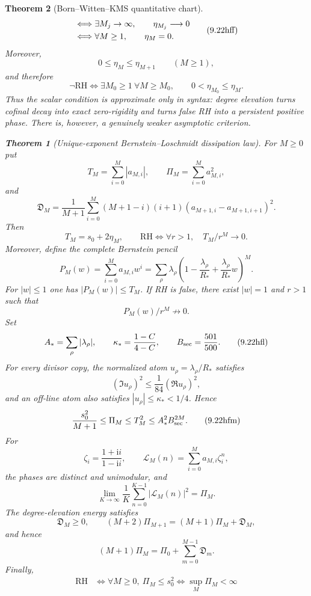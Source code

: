 \documentclass[11pt]{article}
\newtheorem{theorem}{Theorem}[section]
\begin{document}
\begin{theorem}[Born--Witten--KMS quantitative chart]
\[{\begin{aligned}
 &\Longleftrightarrow
 \exists M_j\to\infty,\qquad \eta_{M_j}\longrightarrow0\notag\\
 &\Longleftrightarrow
 \forall M\ge1,\qquad \eta_M=0.
 \end{aligned}}
 \tag{9.22hff}
\]
Moreover,
\[
 0\le\eta_M\le\eta_{M+1}\qquad(M\ge1),
 \tag{9.22hfg}
\]
and therefore
\[
 \neg\mathrm{RH}
 \Longleftrightarrow
 \exists M_0\ge1\ \forall M\ge M_0,\qquad
 0<\eta_{M_0}\le\eta_M.
 \tag{9.22hfh}
\]
Thus the scalar condition is approximate only in syntax: degree elevation turns cofinal decay
into exact zero-rigidity and turns false RH into a persistent positive phase.  There is,
however, a genuinely weaker asymptotic criterion.

\begin{theorem}[Unique-exponent Bernstein--Loschmidt dissipation law]
\label{thm:bernstein-spectral-phase}
For $M\ge0$ put
\[
 T_M=\sum_{i=0}^M|a_{M,i}|,\qquad
 \Pi_M=\sum_{i=0}^M a_{M,i}^2,
\]
and
\[
 \mathfrak D_M=\frac1{M+1}\sum_{i=0}^{M}(M+1-i)(i+1)
 (a_{M+1,i}-a_{M+1,i+1})^2.
\]
Then
\[
 T_M=s_0+2\eta_M,
 \qquad
 \mathrm{RH}\Longleftrightarrow
 \forall r>1,\quad T_M/r^M\longrightarrow0.
 \tag{9.22hfi}
\]
Moreover, define the complete Bernstein pencil
\[
 P_M(w)=\sum_{i=0}^Ma_{M,i}w^i
 =\sum_\rho\lambda_\rho
 \left(1-\frac{\lambda_\rho}{R_*}
       +\frac{\lambda_\rho}{R_*}w\right)^M.
 \tag{9.22hfj}
\]
For $|w|\le1$ one has $|P_M(w)|\le T_M$.  If RH is false, there exist $|w|=1$ and $r>1$ such
that
\[
 P_M(w)/r^M\not\longrightarrow0.
 \tag{9.22hfk}
\]
Set
\[
 A_*=\sum_\rho|\lambda_\rho|,\qquad
 \kappa_*=\frac{1-C}{4-C},\qquad
 B_{\rm sec}=\frac{501}{500}.
 \tag{9.22hfl}
\]
For every divisor copy, the normalized atom $u_\rho=\lambda_\rho/R_*$ satisfies
\[
 (\Im u_\rho)^2\le\frac1{84}(\Re u_\rho)^2,
\]
and an off-line atom also satisfies $|u_\rho|\le\kappa_*<1/4$.  Hence
\[
 \frac{s_0^2}{M+1}\le\Pi_M\le T_M^2\le A_*^2B_{\rm sec}^{2M}.
 \tag{9.22hfm}
\]
For
\[
 \zeta_i=\frac{1+\mathrm i i}{1-\mathrm i i},\qquad
 \mathcal L_M(n)=\sum_{i=0}^M a_{M,i}\zeta_i^n,
\]
the phases are distinct and unimodular, and
\[
 \lim_{K\to\infty}\frac1K\sum_{n=0}^{K-1}|\mathcal L_M(n)|^2=\Pi_M.
 \tag{9.22hfn}
\]
The degree-elevation energy satisfies
\[
 \mathfrak D_M\ge0,\qquad
 (M+2)\Pi_{M+1}=(M+1)\Pi_M+\mathfrak D_M,
 \tag{9.22hfna}
\]
and hence
\[
 (M+1)\Pi_M=\Pi_0+\sum_{m=0}^{M-1}\mathfrak D_m.
 \tag{9.22hfnb}
\]
Finally,
\[
 \begin{aligned}
 \mathrm{RH}
 &\Longleftrightarrow \forall M\ge0,\ \Pi_M\le s_0^2
 \Longleftrightarrow \sup_M\Pi_M<\infty\\

\end{aligned}\]
\end{theorem}
\end{theorem}
\end{document}
